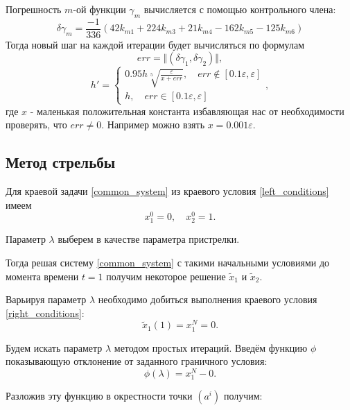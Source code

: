 \documentclass[a4paper,12pt]{article}
\begin{document}
Погрешность \(m\)-ой функции \(\gamma_{m}\) вычисляется с помощью контрольного члена:
\begin{equation*}
  \delta\gamma_{m} = \frac{-1}{336}\left(42 k_{m1}+224k_{m3}+21k_{m4}-162 k_{m5}-125 k_{m6}\right)
\end{equation*}
Тогда новый шаг на каждой итерации будет вычисляться по формулам
\begin{equation*}
  err = \Vert (\delta\gamma_{1}, \delta\gamma_{2})\Vert,
\end{equation*}
\begin{equation*}
  h'=\begin{cases}
    0.95 h \sqrt[5]{\frac{\varepsilon}{x+err}}, \quad err \not\in [0.1 \varepsilon, \varepsilon] \\
    h, \quad  err \in [0.1 \varepsilon, \varepsilon]
  \end{cases},
\end{equation*}
где \(x\) - маленькая
положительная константа избавляющая нас от необходимости проверять, что
\(err \neq 0\). Например можно взять \(x=0.001 \varepsilon\).

\subsection*{Метод стрельбы}

Для краевой задачи \cref{common_system} из краевого условия \cref{left_conditions} имеем
\begin{equation*}
  x_1^0=0, \quad x_2^0=1.
\end{equation*}

Параметр \(\lambda\) выберем в качестве параметра пристрелки.

Тогда решая систему \cref{common_system} с такими начальными условиями до момента времени \(t=1\) получим некоторое решение \(\tilde{x}_1\) и \(\tilde{x}_2\).

Варьируя параметр \(\lambda\) необходимо добиться выполнения краевого условия \cref{right_conditions}:
\begin{equation*}
  \tilde{x}_1(1)=x_1^N=0.
\end{equation*}

Будем искать параметр \(\lambda\) методом простых итераций. Введём функцию \(\phi\) показывающую отклонение от заданного
граничного условия:
\begin{equation*}
  \phi(\lambda)=x_1^N-0.
\end{equation*}

Разложив эту функцию в окрестности точки \((a^{i})\) получим:
\end{document}
